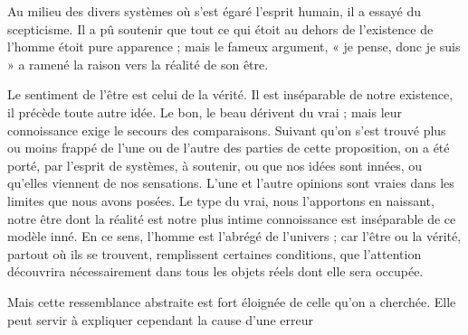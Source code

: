 \documentclass[11pt,a4paper]{article}
\begin{document}
 Au milieu des divers systèmes où s'est égaré l'esprit
humain, il a essayé du scepticisme. Il a pû soutenir que tout ce qui
étoit au dehors de l'existence de l'homme étoit pure apparence ; mais le
fameux argument, « je pense, donc je suis » a ramené la raison vers la
réalité de son être.

Le sentiment de l'être est celui de la vérité. Il est inséparable de
notre existence, il précède toute autre idée. Le bon, le beau dérivent du
vrai ; mais leur connoissance exige le secours des comparaisons. Suivant
qu'on s'est trouvé plus ou moins frappé de l'une ou de l'autre des parties
de cette  proposition, on a été porté, par l'esprit de
systèmes, à soutenir, ou que nos idées sont innées, ou qu'elles viennent
de nos sensations. L'une et l'autre opinions sont \struck{\ill{}} vraies
dans les limites que nous avons posées. Le type du vrai, nous l'apportons en naissant, notre être
dont la réalité est notre plus intime connoissance est inséparable de ce
modèle inné. En ce sens, l'homme est l'abrégé de l'univers ; car l'être
ou la vérité, partout où ils se trouvent, remplissent certaines
conditions, que l'attention découvrira nécessairement \struck{\ill{}} dans
tous les objets réels dont elle sera occupée.

Mais cette ressemblance abstraite est fort éloignée de celle qu'on a
cherchée. Elle peut servir à expliquer cependant la cause d'une
erreur
\end{document}
